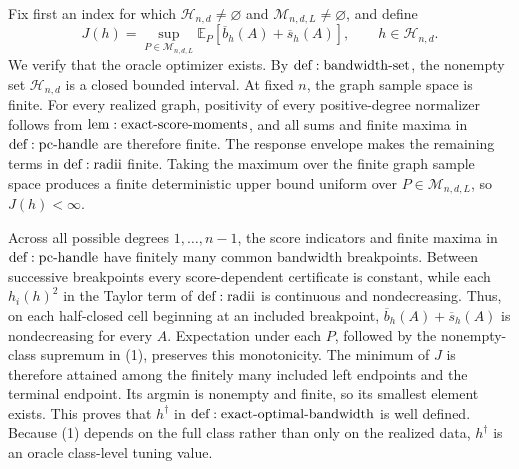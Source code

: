 Fix first an index for which \(\mathcal H_{n,d}\ne\varnothing\) and \(\mathcal M_{n,d,L}\ne\varnothing\), and define
\[
 J(h)=\sup_{P\in\mathcal M_{n,d,L}}
 \mathbb E_P[\overline b_h(A)+\overline s_h(A)],
 \qquad h\in\mathcal H_{n,d}.
\tag{1}
\]
We verify that the oracle optimizer exists.  By \({\rm def:bandwidth\text{-}set}\), the nonempty set \(\mathcal H_{n,d}\) is a closed bounded interval.  At fixed \(n\), the graph sample space is finite.  For every realized graph, positivity of every positive-degree normalizer follows from \({\rm lem:exact\text{-}score\text{-}moments}\), and all sums and finite maxima in \({\rm def:pc\text{-}handle}\) are therefore finite.  The response envelope makes the remaining terms in \({\rm def:radii}\) finite.  Taking the maximum over the finite graph sample space produces a finite deterministic upper bound uniform over \(P\in\mathcal M_{n,d,L}\), so \(J(h)<\infty\).

Across all possible degrees \(1,\ldots,n-1\), the score indicators and finite maxima in \({\rm def:pc\text{-}handle}\) have finitely many common bandwidth breakpoints.  Between successive breakpoints every score-dependent certificate is constant, while each \(h_i(h)^2\) in the Taylor term of \({\rm def:radii}\) is continuous and nondecreasing.  Thus, on each half-closed cell beginning at an included breakpoint, \(\overline b_h(A)+\overline s_h(A)\) is nondecreasing for every \(A\).  Expectation under each \(P\), followed by the nonempty-class supremum in (1), preserves this monotonicity.  The minimum of \(J\) is therefore attained among the finitely many included left endpoints and the terminal endpoint.  Its argmin is nonempty and finite, so its smallest element exists.  This proves that \(h^\dagger\) in \({\rm def:exact\text{-}optimal\text{-}bandwidth}\) is well defined.  Because (1) depends on the full class rather than only on the realized data, \(h^\dagger\) is an oracle class-level tuning value.

